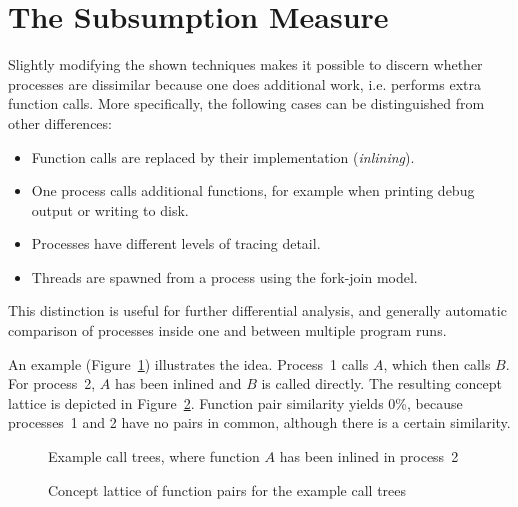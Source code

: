 \documentclass[a4paper, final, diplominf]{zih-template}
\begin{document}
\section{The Subsumption Measure}
\label{sec:new-subsumption}
Slightly modifying the shown techniques makes it possible to discern whether processes are dissimilar because one does additional work, i.e. performs extra function calls.
More specifically, the following cases can be distinguished from other differences:
\begin{itemize}
	\item Function calls are replaced by their implementation (\emph{inlining}).\vspace{-0.5ex}
	\item One process calls additional functions, for example when printing debug output or writing to disk.\vspace{-0.5ex}
	\item Processes have different levels of tracing detail.\vspace{-0.5ex}
	\item Threads are spawned from a process using the fork-join model.
\end{itemize}
This distinction is useful for further differential analysis, and generally automatic comparison of processes inside one and between multiple program runs.

An example (Figure~\ref{fig:subsumption-example-call-stack}) illustrates the idea.
Process~1 calls $A$, which then calls $B$.
For process~2, $A$ has been inlined and $B$ is called directly.
The resulting concept lattice is depicted in Figure~\ref{fig:subsumption-example-concept-lattice}.
Function pair similarity yields 0\%, because processes~1 and 2 have no pairs in common, although there is a certain similarity.
\begin{figure}[tb]
	\centering
	
	\caption{Example call trees, where function $A$ has been inlined in process~2}
	\label{fig:subsumption-example-call-stack}
\end{figure}
\begin{figure}[tb]
	\centering
	
	\caption{Concept lattice of function pairs for the example call trees}
	\label{fig:subsumption-example-concept-lattice}
\end{figure}
\end{document}
